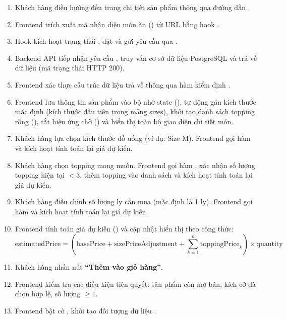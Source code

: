 \begin{enumerate}[label=\textbf{Bước \arabic*:}, leftmargin=4.2em]
  \item Khách hàng điều hướng đến trang chi tiết sản phẩm thông qua đường dẫn .
  \item Frontend trích xuất mã nhận diện món ăn () từ URL bằng hook .
  \item Hook  kích hoạt trạng thái , đặt  và gửi yêu cầu  qua .
  \item Backend API tiếp nhận yêu cầu , truy vấn cơ sở dữ liệu PostgreSQL và trả về dữ liệu  (mã trạng thái HTTP 200).
  \item Frontend xác thực cấu trúc dữ liệu trả về thông qua hàm kiểm định .
  \item Frontend lưu thông tin sản phẩm vào bộ nhớ state (), tự động gán kích thước mặc định (kích thước đầu tiên trong mảng sizes), khởi tạo danh sách topping rỗng (), tắt hiệu ứng chờ () và hiển thị toàn bộ giao diện chi tiết món.
  \item Khách hàng lựa chọn kích thước đồ uống (ví dụ: Size M). Frontend gọi hàm  và kích hoạt tính toán lại giá dự kiến.
  \item Khách hàng chọn topping mong muốn. Frontend gọi hàm , xác nhận số lượng topping hiện tại $< 3$, thêm topping vào danh sách và kích hoạt tính toán lại giá dự kiến.
  \item Khách hàng điều chỉnh số lượng ly cần mua (mặc định là 1 ly). Frontend gọi hàm  và kích hoạt tính toán lại giá dự kiến.
  \item Frontend tính toán giá dự kiến () và cập nhật hiển thị theo công thức:
  \begin{equation}
    \text{estimatedPrice} = \left(\text{basePrice} + \text{sizePriceAdjustment} + \sum_{k=1}^{n} \text{toppingPrice}_k\right) \times \text{quantity}
  \end{equation}
  \item Khách hàng nhấn nút \textbf{``Thêm vào giỏ hàng''}.
  \item Frontend kiểm tra các điều kiện tiên quyết: sản phẩm còn mở bán, kích cỡ đã chọn hợp lệ, số lượng $\ge 1$.
  \item Frontend bật cờ , khởi tạo đối tượng dữ liệu .

\end{enumerate}
